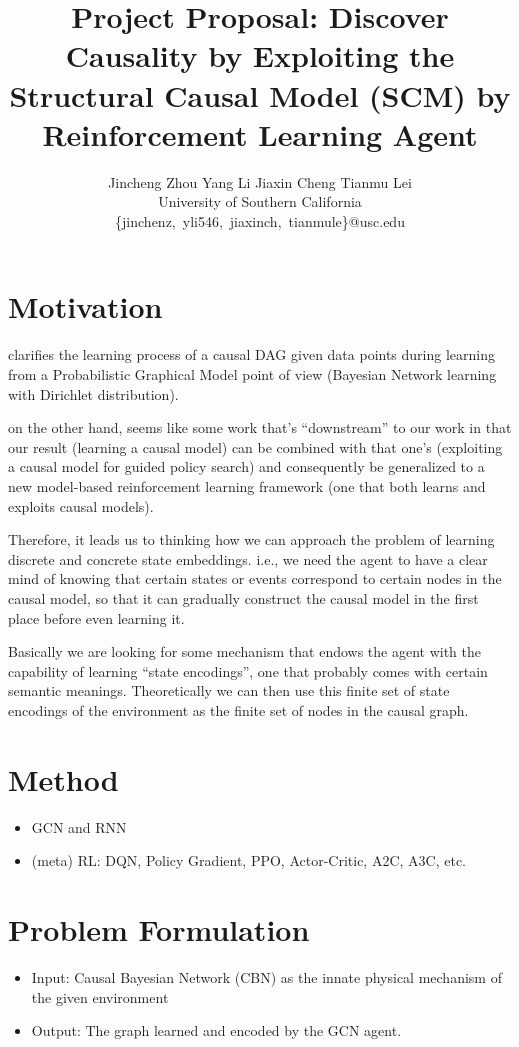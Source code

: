\documentclass{article}
\title{Project Proposal: Discover Causality by Exploiting the Structural Causal Model (SCM) by Reinforcement Learning Agent}
\author{%
  Jincheng Zhou \qquad Yang Li \qquad Jiaxin Cheng \qquad Tianmu Lei \vspace{.3em} \\ 
  \large University of Southern California \vspace{.2em}\\ 
  \normalsize
  \{jinchenz,~yli546,~jiaxinch,~tianmule\}@usc.edu 
}
\begin{document}
\maketitle

\section{Motivation}

\cite{2018arXiv180701268G} clarifies the learning process of a causal DAG given data points during learning from a Probabilistic Graphical Model point of view (Bayesian Network learning with Dirichlet distribution). 

\cite{buesing2018woulda}  on the other hand, seems like some work that’s “downstream” to our work in that our result (learning a causal model) can be combined with that one’s (exploiting a causal model for guided policy search) and consequently be generalized to a new model-based reinforcement learning framework (one that both learns and exploits causal models).

Therefore, it leads us to thinking how we can approach the problem of learning discrete and concrete state embeddings. i.e., we need the agent to have a clear mind of knowing that certain states or events correspond to certain nodes in the causal model, so that it can gradually construct the causal model in the first place before even learning it.

Basically we are looking for some mechanism that endows the agent with the capability of learning “state encodings”, one that probably comes with certain semantic meanings. Theoretically we can then use this finite set of state encodings of the environment as the finite set of nodes in the causal graph.

\section{Method}
\begin{itemize}
  \item GCN and RNN
  \item (meta) RL: DQN, Policy Gradient, PPO, Actor-Critic, A2C, A3C, etc.
\end{itemize}

\section{Problem Formulation}
\begin{itemize}
  \item Input: Causal Bayesian Network (CBN) as the innate physical mechanism of the given environment	
  \item Output: The graph learned and encoded by the GCN agent.
\end{itemize}
\end{document}
